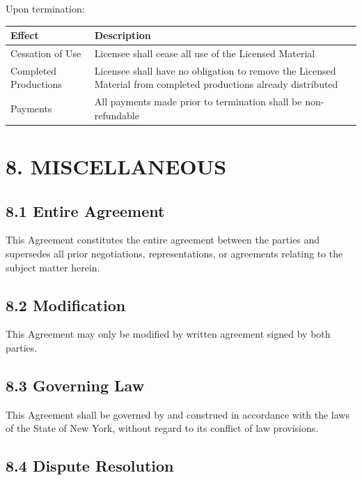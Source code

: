 \documentclass[
  11pt,
]{article}
\begin{document}
Upon termination:

\begin{table}[h]
\centering
\begin{tabular}{L{3.5cm}L{10.5cm}}
\toprule
\textbf{Effect} & \textbf{Description} \\
\midrule
Cessation of Use & Licensee shall cease all use of the Licensed Material \\
Completed Productions & Licensee shall have no obligation to remove the Licensed Material from completed productions already distributed \\
Payments & All payments made prior to termination shall be non-refundable \\
\bottomrule
\end{tabular}
\end{table}

\hypertarget{miscellaneous}{%
\section{8. MISCELLANEOUS}\label{miscellaneous}}

\hypertarget{entire-agreement}{%
\subsection{8.1 Entire Agreement}\label{entire-agreement}}

This Agreement constitutes the entire agreement between the parties and
supersedes all prior negotiations, representations, or agreements
relating to the subject matter herein.

\hypertarget{modification}{%
\subsection{8.2 Modification}\label{modification}}

This Agreement may only be modified by written agreement signed by both
parties.

\hypertarget{governing-law}{%
\subsection{8.3 Governing Law}\label{governing-law}}

This Agreement shall be governed by and construed in accordance with the
laws of the State of New York, without regard to its conflict of law
provisions.

\hypertarget{dispute-resolution}{%
\subsection{8.4 Dispute Resolution}\label{dispute-resolution}}
\end{document}
